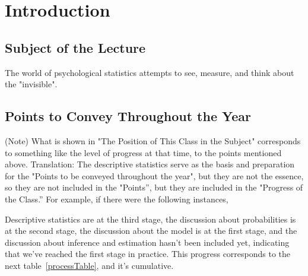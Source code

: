 \section*{Introduction}
\subsection*{Subject of the Lecture}

The world of psychological statistics attempts to see, measure, and think about the "invisible".

\subsection*{Points to Convey Throughout the Year}


(Note) What is shown in "The Position of This Class in the Subject" corresponds to something like the level of progress at that time, to the points mentioned above.
Translation: The descriptive statistics serve as the basis and preparation for the "Points to be conveyed throughout the year", but they are not the essence, so they are not included in the "Points'', but they are included in the "Progress of the Class.'' For example, if there were the following instances,

Descriptive statistics are at the third stage, the discussion about probabilities is at the second stage, the discussion about the model is at the first stage, and the discussion about inference and estimation hasn't been included yet, indicating that we've reached the first stage in practice. This progress corresponds to the next table~\ref{processTable}, and it's cumulative.

